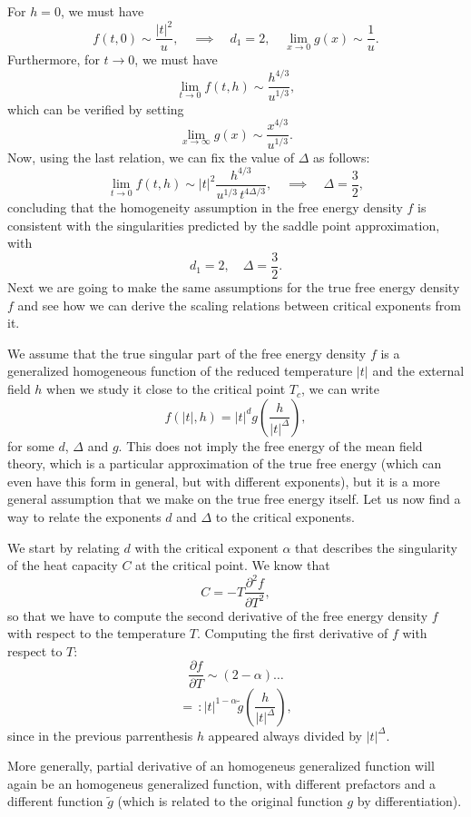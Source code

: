 For \(h=0\), we must have
\[
    f(t,0) \sim \frac{\vert t \vert^2}{u}, \quad \implies \quad d_1 = 2, \quad \lim_{x \to 0} g(x) \sim \frac{1}{u}.
\]
Furthermore, for \(t \to 0\), we must have
\[
    \lim_{t \to 0} f(t,h) \sim \frac{h^{4/3}}{u^{1/3}},
\]
which can be verified by setting
\[
    \lim_{x \to \infty} g(x) \sim \frac{x^{4/3}}{u^{1/3}}.
\]
Now, using the last relation, we can fix the value of \(\Delta\) as follows:
\[
    \lim_{t \to 0} f(t,h) \sim \vert t \vert^2 \frac{h^{4/3}}{u^{1/3} \, t^{4\Delta/3}}, \quad \implies \quad \Delta = \frac{3}{2},
\]
concluding that the homogeneity assumption in the free energy density \(f\) is consistent with the singularities predicted by the saddle point approximation, with
\[
    d_1 = 2, \quad \Delta = \frac{3}{2}.
\]
Next we are going to make the same assumptions for the true free energy density \(f\) and see how we can derive the scaling relations between critical exponents from it.

We assume that the true singular part of the free energy density \(f\) is a generalized homogeneous function of the reduced temperature \(\vert t \vert\) and the external field \(h\) when we study it close to the critical point \(T_c\), we can write
\[
    f(\vert t \vert, h) = \vert t \vert^{d} g\left(\frac{h}{\vert t \vert^{\Delta}}\right),
\]
for some \(d\), \(\Delta\) and \(g\). This does not imply the free energy of the mean field theory, which is a particular approximation of the true free energy (which can even have this form in general, but with different exponents), but it is a more general assumption that we make on the true free energy itself. Let us now find a way to relate the exponents \(d\) and \(\Delta\) to the critical exponents.

We start by relating \(d\) with the critical exponent \(\alpha\) that describes the singularity of the heat capacity \(C\) at the critical point. We know that
\[
    C = -T \frac{\partial^2 f}{\partial T^2},
\]
so that we have to compute the second derivative of the free energy density \(f\) with respect to the temperature \(T\). Computing the first derivative of \(f\) with respect to \(T\):
\[
    \frac{\partial f}{\partial T} \sim (2-\alpha) \dots
\]
\[
    = \, : \vert t \vert^{1-\alpha} \tilde{g}\left(\frac{h}{\vert t \vert^{\Delta}}\right),
\]
since in the previous parrenthesis \(h\) appeared always divided by \(\vert t \vert^{\Delta}\).

\begin{remark}
    More generally, partial derivative of an homogeneus generalized function will again be an homogeneus generalized function, with different prefactors and a different function \(\tilde{g}\) (which is related to the original function \(g\) by differentiation).
\end{remark}

